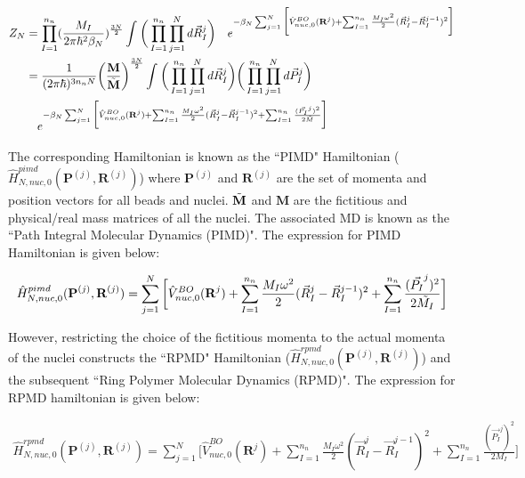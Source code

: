 \begin{align}
    \label{QNMD-1}
    Z_{N}&=\prod_{I=1}^{n_n} (\frac{M_I}{2\pi \hbar^2 \beta_N})^{\frac{3N}{2}} \int_{}^{} \bigg(\prod_{I=1}^{n_n} \prod_{j=1}^{N} d\vec{R}^{j}_{I}\bigg) \quad e^{-\beta_N \sum_{j=1}^{N}    \bigg[\hat{V}^{BO}_{nuc,0}(\textbf{R}^{j})+ \sum_{I=1}^{n_n} \frac{M_I\omega^2}{2}(\vec{R}^{j}_{I}-\vec{R}^{j-1}_{I})^2\bigg]}\notag\\ 
    &=\frac{1}{(2\pi\hbar)^{3n_nN}} \bigg(\frac{\textbf{M}}{\Tilde{\textbf{M}}}\bigg)^{\frac{3N}{2}} \int_{}^{} \bigg(\prod_{I=1}^{n_n} \prod_{j=1}^{N} d\vec{R}^{j}_{I}\bigg) \bigg(\prod_{I=1}^{n_n} \prod_{j=1}^{N} d\vec{P}^{j}_{I}\bigg)\notag\\ 
    & \quad e^{-\beta_N \sum_{j=1}^{N}  \bigg[\hat{V}^{BO}_{nuc,0}(\textbf{R}^{j})+ \sum_{I=1}^{n_n} \frac{M_I\omega^2}{2}(\vec{R}^{j}_{I}-\vec{R}^{j-1}_{I})^2 + \sum_{I=1}^{n_n} \frac{(\vec{P_I}^j)^2}{2\Tilde{M}}\bigg]}\notag\\     
\end{align}

   


 \noindent The corresponding Hamiltonian is known as the ``PIMD" Hamiltonian ($\hat{H}^{pimd}_{N,nuc,0}(\textbf{P}^{(j)},\textbf{R}^{(j)})$) where $\textbf{P}^{(j)}$ and $\textbf{R}^{(j)}$ are the set of momenta and position vectors for all beads and nuclei. $\Tilde{\textbf{M}}$ and $\textbf{{M}}$ are the fictitious and physical/real mass matrices of all the nuclei. The associated MD is known as the ``Path Integral Molecular Dynamics (PIMD)". The expression for PIMD Hamiltonian is given below:

\begin{align}
\label{QNMD-2}
    \hat{H}^{pimd}_{N,nuc,0}(\textbf{P}^{(j)},\textbf{R}^{(j)})=\sum_{j=1}^{N}  \bigg[\hat{V}^{BO}_{nuc,0}(\textbf{R}^{j})+ \sum_{I=1}^{n_n} \frac{M_I\omega^2}{2}(\vec{R}^{j}_{I}-\vec{R}^{j-1}_{I})^2 + \sum_{I=1}^{n_n} \frac{(\vec{P_I}^j)^2}{2\Tilde{M_I}}\bigg]
\end{align}

\noindent  However, restricting the choice of the fictitious momenta to the actual momenta of the nuclei constructs the ``RPMD" Hamiltonian ($\hat{H}^{rpmd}_{N,nuc,0}(\textbf{P}^{(j)},\textbf{R}^{(j)})$) and the subsequent ``Ring Polymer Molecular Dynamics (RPMD)". The expression for RPMD hamiltonian is given below: 

\begin{align}
\label{QNMD-3}
    \hat{H}^{rpmd}_{N,nuc,0}(\textbf{P}^{(j)},\textbf{R}^{(j)})=\sum_{j=1}^{N}  \bigg[\hat{V}^{BO}_{nuc,0}(\textbf{R}^{j})+ \sum_{I=1}^{n_n} \frac{M_I\omega^2}{2}(\vec{R}^{j}_{I}-\vec{R}^{j-1}_{I})^2 + \sum_{I=1}^{n_n} \frac{(\vec{P_I}^j)^2}{2M_I}\bigg]
\end{align}

